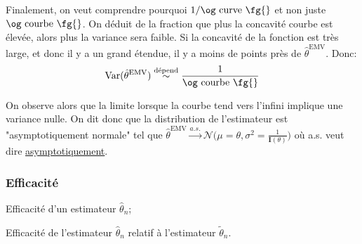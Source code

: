 \documentclass[10pt, french]{article}
\begin{document}
\begin{multicols*}{2}
Finalement, on veut comprendre pourquoi $1/\text{\og curve \fg{}}$ et non juste $\text{\og courbe \fg{}}$. On déduit de la fraction que plus la concavité \og courbe \fg{} est élevée, alors plus la variance sera faible. Si la concavité de la fonction est très large, et donc il y a un grand étendue, il y a moins de points près de $\hat\theta^{\text{EMV}}$. Donc:
\begin{equation*}
	\text{Var}(\hat\theta^{\text{EMV}}) 
	\overset{\text{dépend}}{\sim} \frac{1}{\text{\og courbe \fg{}}}	\\
\end{equation*}

On observe alors que la limite lorsque la \og courbe \fg{} tend vers l'infini implique une variance nulle. On dit donc que la distribution de l'estimateur est "asymptotiquement normale" tel que $\hat\theta^{\text{EMV}} \overset{a.s.}{\rightarrow} \mathcal{N}\Big(\mu = \theta, \sigma^{2} = \frac{1}{\bm{I}(\theta)}\Big)$ où a.s. veut dire \hyperlink{asympto}{asymptotiquement}.

\columnbreak
\subsubsection{Efficacité}
\begin{distributions}[Notation]
\begin{description}[font = \normalfont]
	\item[$\text{eff}(\hat{\theta}_{n})$]	Efficacité d'un estimateur $\hat{\theta}_{n}$;
	\item[$\text{eff}(\hat\theta_{n}, \tilde\theta_{n})$]	Efficacité de l'estimateur $\hat{\theta}_{n}$ relatif à l'estimateur $\tilde{\theta}_{n}$.
\end{description}
\end{distributions}


\end{multicols*}
\end{document}

